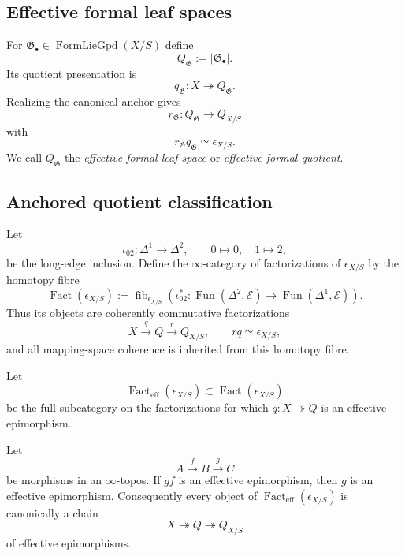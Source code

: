 \subsection{Effective formal leaf spaces}

\begin{definition}
\label{def:formal-leaf-space}
For
$\mathfrak G_\bullet\in\operatorname{FormLieGpd}(X/S)$ define
\[
    Q_{\mathfrak G}
    :=
    \lvert\mathfrak G_\bullet\rvert.
\]
Its quotient presentation is
\[
    q_{\mathfrak G}:
    X\twoheadrightarrow Q_{\mathfrak G}.
\]
Realizing the canonical anchor gives
\[
    r_{\mathfrak G}:
    Q_{\mathfrak G}
    \longrightarrow
    Q_{X/S}
\]
with
\[
    r_{\mathfrak G}q_{\mathfrak G}
    \simeq
    \epsilon_{X/S}.
\]
We call $Q_{\mathfrak G}$ the \emph{effective formal leaf space} or
\emph{effective formal quotient}.
\end{definition}

\subsection{Anchored quotient classification}

\begin{definition}
\label{def:infinitesimal-quotient-factorizations}
Let
\[
    \iota_{02}:\Delta^1\longrightarrow\Delta^2,
    \qquad
    0\longmapsto0,\quad 1\longmapsto2,
\]
be the long-edge inclusion.  Define the $\infty$-category of factorizations of
$\epsilon_{X/S}$ by the homotopy fibre
\[
    \operatorname{Fact}(\epsilon_{X/S})
    :=
    \operatorname{fib}_{\epsilon_{X/S}}
    \left(
        \iota_{02}^*:
        \operatorname{Fun}(\Delta^2,\mathcal E)
        \longrightarrow
        \operatorname{Fun}(\Delta^1,\mathcal E)
    \right).
\]
Thus its objects are coherently commutative factorizations
\[
    X\xrightarrow{q}Q\xrightarrow{r}Q_{X/S},
    \qquad
    rq\simeq\epsilon_{X/S},
\]
and all mapping-space coherence is inherited from this homotopy fibre.

Let
\[
    \operatorname{Fact}_{\mathrm{eff}}(\epsilon_{X/S})
    \subset
    \operatorname{Fact}(\epsilon_{X/S})
\]
be the full subcategory on the factorizations for which
$q:X\twoheadrightarrow Q$ is an effective epimorphism.
\end{definition}

\begin{lemma}
\label{lem:second-factor-effective}
Let
\[
    A\xrightarrow{f}B\xrightarrow{g}C
\]
be morphisms in an $\infty$-topos.  If $gf$ is an effective epimorphism, then
$g$ is an effective epimorphism.  Consequently every object of
$\operatorname{Fact}_{\mathrm{eff}}(\epsilon_{X/S})$ is canonically a chain
\[
    X\twoheadrightarrow Q\twoheadrightarrow Q_{X/S}
\]
of effective epimorphisms.
\end{lemma}

